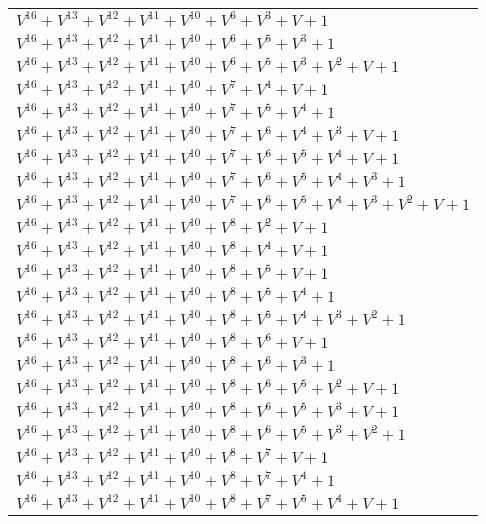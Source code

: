 \documentclass[12pt]{article}
\begin{document}
\begin{adjustwidth}{-4cm}{}
\begin{center}
\begin{longtable}{|l|}
$V^{16}  +V^{13}  +V^{12}  +V^{11}  +V^{10}  +V^{6}  +V^{3}  + V + 1$ \\
$V^{16}  +V^{13}  +V^{12}  +V^{11}  +V^{10}  +V^{6}  +V^{5}  +V^{3}  + 1$ \\
$V^{16}  +V^{13}  +V^{12}  +V^{11}  +V^{10}  +V^{6}  +V^{5}  +V^{3}  +V^{2}  + V + 1$ \\
$V^{16}  +V^{13}  +V^{12}  +V^{11}  +V^{10}  +V^{7}  +V^{4}  + V + 1$ \\
$V^{16}  +V^{13}  +V^{12}  +V^{11}  +V^{10}  +V^{7}  +V^{5}  +V^{4}  + 1$ \\
$V^{16}  +V^{13}  +V^{12}  +V^{11}  +V^{10}  +V^{7}  +V^{6}  +V^{4}  +V^{3}  + V + 1$ \\
$V^{16}  +V^{13}  +V^{12}  +V^{11}  +V^{10}  +V^{7}  +V^{6}  +V^{5}  +V^{4}  + V + 1$ \\
$V^{16}  +V^{13}  +V^{12}  +V^{11}  +V^{10}  +V^{7}  +V^{6}  +V^{5}  +V^{4}  +V^{3}  + 1$ \\
$V^{16}  +V^{13}  +V^{12}  +V^{11}  +V^{10}  +V^{7}  +V^{6}  +V^{5}  +V^{4}  +V^{3}  +V^{2}  + V + 1$ \\
$V^{16}  +V^{13}  +V^{12}  +V^{11}  +V^{10}  +V^{8}  +V^{2}  + V + 1$ \\
$V^{16}  +V^{13}  +V^{12}  +V^{11}  +V^{10}  +V^{8}  +V^{4}  + V + 1$ \\
$V^{16}  +V^{13}  +V^{12}  +V^{11}  +V^{10}  +V^{8}  +V^{5}  + V + 1$ \\
$V^{16}  +V^{13}  +V^{12}  +V^{11}  +V^{10}  +V^{8}  +V^{5}  +V^{4}  + 1$ \\
$V^{16}  +V^{13}  +V^{12}  +V^{11}  +V^{10}  +V^{8}  +V^{5}  +V^{4}  +V^{3}  +V^{2}  + 1$ \\
$V^{16}  +V^{13}  +V^{12}  +V^{11}  +V^{10}  +V^{8}  +V^{6}  + V + 1$ \\
$V^{16}  +V^{13}  +V^{12}  +V^{11}  +V^{10}  +V^{8}  +V^{6}  +V^{3}  + 1$ \\
$V^{16}  +V^{13}  +V^{12}  +V^{11}  +V^{10}  +V^{8}  +V^{6}  +V^{5}  +V^{2}  + V + 1$ \\
$V^{16}  +V^{13}  +V^{12}  +V^{11}  +V^{10}  +V^{8}  +V^{6}  +V^{5}  +V^{3}  + V + 1$ \\
$V^{16}  +V^{13}  +V^{12}  +V^{11}  +V^{10}  +V^{8}  +V^{6}  +V^{5}  +V^{3}  +V^{2}  + 1$ \\
$V^{16}  +V^{13}  +V^{12}  +V^{11}  +V^{10}  +V^{8}  +V^{7}  + V + 1$ \\
$V^{16}  +V^{13}  +V^{12}  +V^{11}  +V^{10}  +V^{8}  +V^{7}  +V^{4}  + 1$ \\
$V^{16}  +V^{13}  +V^{12}  +V^{11}  +V^{10}  +V^{8}  +V^{7}  +V^{5}  +V^{4}  + V + 1$ \\

\end{longtable}
\end{center}
\end{adjustwidth}
\end{document}
